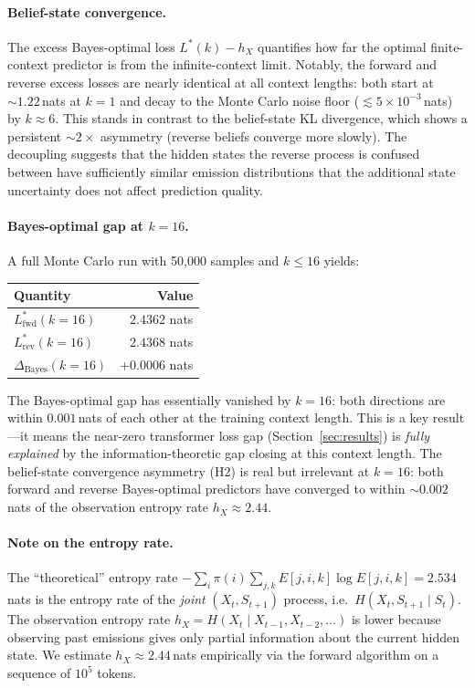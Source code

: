 \documentclass[11pt]{article}
\begin{document}
\paragraph{Belief-state convergence.}
The excess Bayes-optimal loss $L^*(k) - h_X$ quantifies how far the optimal finite-context predictor is from the infinite-context limit.  Notably, the forward and reverse excess losses are nearly identical at all context lengths: both start at $\sim 1.22$\,nats at $k = 1$ and decay to the Monte Carlo noise floor ($\lesssim 5 \times 10^{-3}$\,nats) by $k \approx 6$.  This stands in contrast to the belief-state KL divergence, which shows a persistent $\sim 2\times$ asymmetry (reverse beliefs converge more slowly).  The decoupling suggests that the hidden states the reverse process is confused between have sufficiently similar emission distributions that the additional state uncertainty does not affect prediction quality.

\paragraph{Bayes-optimal gap at $k = 16$.}
A full Monte Carlo run with 50{,}000 samples and $k \le 16$ yields:
\begin{center}
  \begin{tabular}{l r}
    \toprule
    Quantity & Value \\
    \midrule
    $L^{*}_{\mathrm{fwd}}(k{=}16)$ & $2.4362$ nats \\
    $L^{*}_{\mathrm{rev}}(k{=}16)$ & $2.4368$ nats \\
    $\Delta_{\mathrm{Bayes}}(k{=}16)$ & $+0.0006$ nats \\
    \bottomrule
  \end{tabular}
\end{center}
The Bayes-optimal gap has essentially vanished by $k = 16$: both directions are within $0.001$\,nats of each other at the training context length.  This is a key result---it means the near-zero transformer loss gap (Section~\ref{sec:results}) is \emph{fully explained} by the information-theoretic gap closing at this context length.  The belief-state convergence asymmetry (H2) is real but irrelevant at $k = 16$: both forward and reverse Bayes-optimal predictors have converged to within $\sim 0.002$\,nats of the observation entropy rate $h_X \approx 2.44$.

\paragraph{Note on the entropy rate.}
The ``theoretical'' entropy rate $-\sum_i \pi(i) \sum_{j,k} E[j,i,k] \log E[j,i,k] = 2.534$\,nats is the entropy rate of the \emph{joint} $(X_t, S_{t+1})$ process, i.e.\ $H(X_t, S_{t+1} \mid S_t)$.  The observation entropy rate $h_X = H(X_t \mid X_{t-1}, X_{t-2}, \ldots)$ is lower because observing past emissions gives only partial information about the current hidden state.  We estimate $h_X \approx 2.44$\,nats empirically via the forward algorithm on a sequence of $10^5$ tokens.
\end{document}
